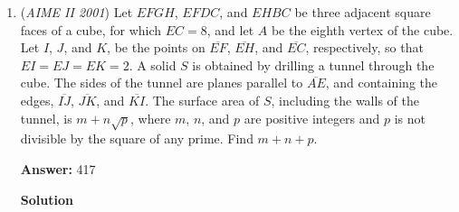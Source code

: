 \begin{enumerate}
 We plug these values into our equation and simplify to find that $\cos(28\theta)=\frac{1}{2}$.

 This means that $28\theta=\pm 60 (mod 360)$.

 We now do casework.

 Case $1$:

 $28\theta=60 (mod 360)$.

 $7\theta=15 (mod 90)$.

 We now proceed with the modular inverse to isolate $\theta$. For $7x=1 (mod 90)$ we see that $x=13$ works. 

 $91\theta=195 (mod 90)$
$\theta=15 (mod 90)$.

 Case $2$ :

 $28\theta=-60 (mod 360)$.

 $28\theta=300 (mod 360)$.

 $7\theta=75 (mod 90)$.

 $\theta=75 (mod 90)$.

 We have that $\theta= 15,75 (mod 90)$.

 We now list the solutions to each of these conditions for angles less than $360$.

 Condition $1$ $\theta=(15,105,195,285)$, Condition $2$, $\theta=(75,165,255,345)$. 

 These are the $2n$ values that satisfy the problem. We order them in increasing order and add the values in the even places.

 $75+165+255+345=\boxed{840}$.

 


	\item (\textit{AIME II 2001}) Let $EFGH$, $EFDC$, and $EHBC$ be three adjacent square faces of a cube, for which $EC = 8$, and let $A$ be the eighth vertex of the cube. Let $I$, $J$, and $K$, be the points on $\overline{EF}$, $\overline{EH}$, and $\overline{EC}$, respectively, so that $EI = EJ = EK = 2$. A solid $S$ is obtained by drilling a tunnel through the cube. The sides of the tunnel are planes parallel to $\overline{AE}$, and containing the edges, $\overline{IJ}$, $\overline{JK}$, and $\overline{KI}$. The surface area of $S$, including the walls of the tunnel, is $m + n\sqrt {p}$, where $m$, $n$, and $p$ are positive integers and $p$ is not divisible by the square of any prime. Find $m + n + p$.


 
 \textbf{Answer: }417



\textbf{Solution}



\end{enumerate}
